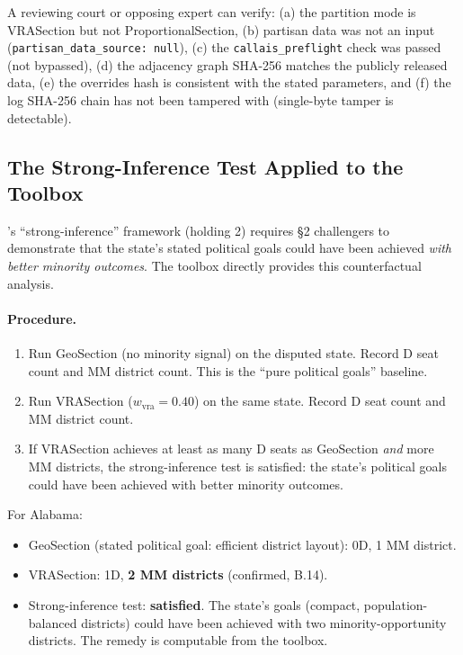 A reviewing court or opposing expert can verify:
(a) the partition mode is VRASection but not ProportionalSection,
(b) partisan data was not an input (\texttt{partisan\_data\_source: null}),
(c) the \texttt{callais\_preflight} check was passed (not bypassed),
(d) the adjacency graph SHA-256 matches the publicly released data,
(e) the overrides hash is consistent with the stated parameters, and
(f) the log SHA-256 chain has not been tampered with (single-byte tamper
    is detectable).

\subsection{The Strong-Inference Test Applied to the Toolbox}

\callais{}'s ``strong-inference'' framework (holding 2) requires \S2 challengers
to demonstrate that the state's stated political goals could have been achieved
\emph{with better minority outcomes}.
The toolbox directly provides this counterfactual analysis.

\paragraph{Procedure.}
\begin{enumerate}
  \item Run GeoSection (no minority signal) on the disputed state.
    Record D seat count and MM district count. This is the ``pure political
    goals'' baseline.
  \item Run VRASection ($w_\text{vra} = 0.40$) on the same state.
    Record D seat count and MM district count.
  \item If VRASection achieves at least as many D seats as GeoSection \emph{and}
    more MM districts, the strong-inference test is satisfied: the state's
    political goals could have been achieved with better minority outcomes.
\end{enumerate}

For Alabama:
\begin{itemize}
  \item GeoSection (stated political goal: efficient district layout):
    0D, 1 MM district.
  \item VRASection: 1D, \textbf{2 MM districts} (confirmed, B.14).
  \item Strong-inference test: \textbf{satisfied}.
    The state's goals (compact, population-balanced districts) could have been
    achieved with two minority-opportunity districts.
    The \allenmilligan{} remedy is computable from the toolbox.
\end{itemize}

